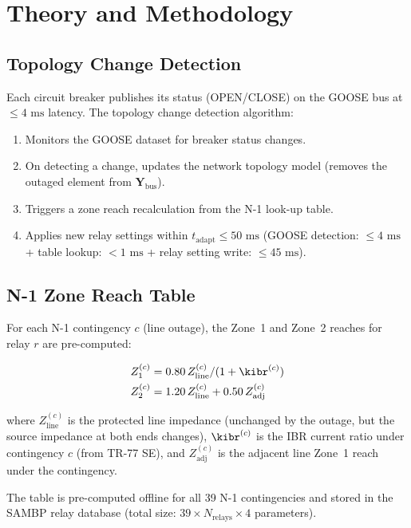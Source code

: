 \documentclass[11pt, a4paper]{article}
\newcommand{\ms}{\,\text{ms}}
\begin{document}
\section{Theory and Methodology}
\label{sec:theory}

\subsection{Topology Change Detection}

Each circuit breaker publishes its status (OPEN/CLOSE) on the GOOSE bus
at $\leq 4\,\ms$ latency. The topology change detection algorithm:
\begin{enumerate}
  \item Monitors the GOOSE dataset for breaker status changes.
  \item On detecting a change, updates the network topology model
    (removes the outaged element from $\mathbf{Y}_{\mathrm{bus}}$).
  \item Triggers a zone reach recalculation from the N-1 look-up table.
  \item Applies new relay settings within $t_{\mathrm{adapt}} \leq 50\,\ms$
    (GOOSE detection: $\leq 4\,\ms$ + table lookup: $< 1\,\ms$ +
    relay setting write: $\leq 45\,\ms$).
\end{enumerate}

\subsection{N-1 Zone Reach Table}

For each N-1 contingency $c$ (line outage), the Zone~1 and Zone~2 reaches
for relay $r$ are pre-computed:

\begin{align}
  Z_1^{(c)} &= 0.80 \, Z_{\mathrm{line}}^{(c)} / (1 + \kibr^{(c)})
  \label{eq:z1}\\
  Z_2^{(c)} &= 1.20 \, Z_{\mathrm{line}}^{(c)} + 0.50 \, Z_{\mathrm{adj}}^{(c)}
  \label{eq:z2}
\end{align}

\noindent where $Z_{\mathrm{line}}^{(c)}$ is the protected line impedance
(unchanged by the outage, but the source impedance at both ends changes),
$\kibr^{(c)}$ is the IBR current ratio under contingency $c$ (from TR-77 SE),
and $Z_{\mathrm{adj}}^{(c)}$ is the adjacent line Zone~1 reach under the contingency.

The table is pre-computed offline for all 39 N-1 contingencies and stored
in the SAMBP relay database (total size: $39 \times N_{\mathrm{relays}} \times 4$
parameters).
\end{document}
